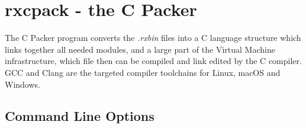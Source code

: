 \chapter{rxcpack - the \crexx{} C Packer}
The C Packer program converts the \emph{.rxbin} files into a C
language structure which links together all needed modules, and a
large part of the Virtual Machine infrastructure, which file then can
be compiled and link edited by the C compiler. GCC and Clang are the
targeted compiler toolchains for Linux, macOS and Windows.
\section{Command Line Options}
\begin{shaded}
  \small
  \obeylines {}
 \end{shaded}

